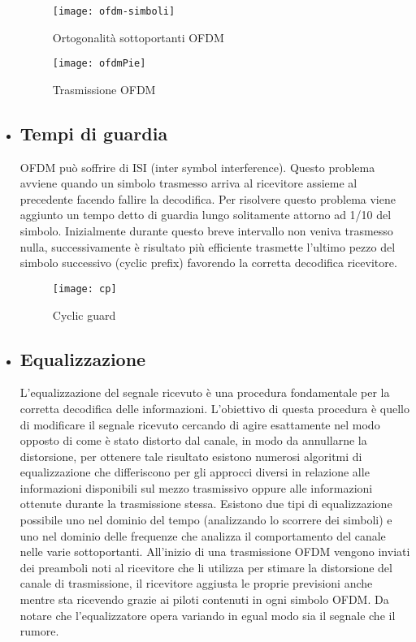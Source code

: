 \begin{itemize}
	 \begin{figure}[h]
	 	\centering
	 	\begin{minipage}[b]{.50\columnwidth}
	 		\texttt{[image: ofdm-simboli]}
	 		\caption{Ortogonalità sottoportanti OFDM \cite{ofdm-simboli}}\label{fig:1}
	 	\end{minipage}\hfill
	 	\begin{minipage}[b]{.50\columnwidth}
	 		\texttt{[image: ofdmPie]}
	 		\caption{Trasmissione OFDM }\label{fig:1}
	 	\end{minipage}\hfill
	 \end{figure}

 	 \item \subsection{Tempi di guardia } OFDM può soffrire di ISI (inter symbol interference). Questo problema avviene quando un simbolo trasmesso arriva al ricevitore assieme al precedente facendo fallire la decodifica. Per risolvere questo problema viene aggiunto un tempo detto di guardia lungo solitamente attorno ad 1/10 del simbolo. Inizialmente durante questo breve intervallo non veniva trasmesso nulla, successivamente è risultato più efficiente trasmette l'ultimo pezzo del simbolo successivo (cyclic prefix) favorendo la corretta decodifica  ricevitore.
 	 \begin{figure}[h]
 	 	\centering
 	 	\texttt{[image: cp]}
 	 	\caption{Cyclic guard \cite{cp}}\label{fig:1}
 	 \end{figure}
     \item \subsection{Equalizzazione} L'equalizzazione del segnale ricevuto è una procedura fondamentale per la corretta decodifica delle informazioni. L'obiettivo di questa procedura è quello di modificare il segnale ricevuto cercando di agire esattamente nel modo opposto di come è stato distorto dal canale, in modo da annullarne la distorsione, per ottenere tale risultato esistono numerosi algoritmi di equalizzazione che differiscono per gli approcci diversi in relazione alle informazioni disponibili sul mezzo trasmissivo oppure alle informazioni ottenute durante la trasmissione stessa. Esistono due tipi di equalizzazione possibile uno nel dominio del tempo (analizzando lo scorrere dei simboli) e uno nel dominio delle frequenze che analizza il comportamento del canale nelle varie sottoportanti. All'inizio di una trasmissione OFDM vengono inviati dei preamboli noti al ricevitore che li utilizza per stimare la distorsione del canale di trasmissione, il ricevitore aggiusta le proprie previsioni anche mentre sta ricevendo grazie ai piloti contenuti in ogni simbolo OFDM. Da notare che l'equalizzatore opera variando in egual modo sia il segnale che il rumore.

\end{itemize}
